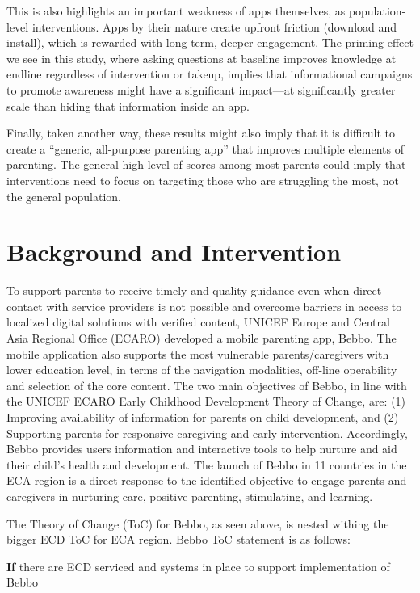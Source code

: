 This is also highlights an important weakness of apps themselves, as population-level interventions. Apps by their nature create upfront friction (download and install), which is rewarded with long-term, deeper engagement. The priming effect we see in this study, where asking questions at baseline improves knowledge at endline regardless of intervention or takeup, implies that informational campaigns to promote awareness might have a significant impact---at significantly greater scale than hiding that information inside an app.

Finally, taken another way, these results might also imply that it is difficult to create a ``generic, all-purpose parenting app'' that improves multiple elements of parenting. The general high-level of scores among most parents could imply that interventions need to focus on targeting those who are struggling the most, not the general population.

\section{Background and Intervention}

To support parents to receive timely and quality guidance even when direct contact with service providers is not possible and overcome barriers in access to localized digital solutions with verified content, UNICEF Europe and Central Asia Regional Office (ECARO) developed a mobile parenting app, Bebbo. The mobile application also supports the most vulnerable parents/caregivers with lower education level, in terms of the navigation modalities, off-line operability and selection of the core content. The two main objectives of Bebbo, in line with the UNICEF ECARO Early Childhood Development Theory of Change, are: (1) Improving availability of information for parents on child development, and (2) Supporting parents for responsive caregiving and early intervention. Accordingly, Bebbo provides users information and interactive tools to help nurture and aid their child’s health and development. The launch of Bebbo in 11 countries in the ECA region is a direct response to the identified objective to engage parents and caregivers in nurturing care, positive parenting, stimulating, and learning.

The Theory of Change (ToC) for Bebbo, as seen above, is nested withing the bigger ECD ToC for ECA region. Bebbo ToC statement is as follows:

\textbf{If} there are ECD serviced and systems in place to support implementation of Bebbo

